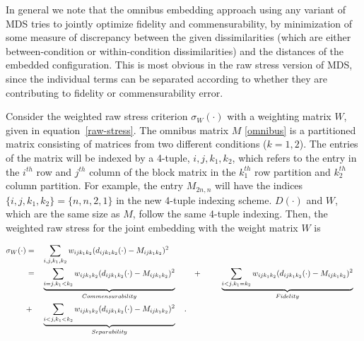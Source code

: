 \documentclass[12pt,oneside,final]{thesis}
\begin{document}
In general we note that the omnibus embedding approach using any variant of MDS tries to jointly optimize fidelity and commensurability, by minimization of some measure of discrepancy between the given dissimilarities (which are either between-condition or within-condition dissimilarities) and the distances of the embedded configuration. This is most obvious in the  raw stress version of  MDS, since the individual terms can be separated according to whether they are contributing to  fidelity or  commensurability  error.

 Consider the weighted raw stress criterion $\sigma_{W}(\cdot)$ with a weighting matrix $W$, given in equation~\eqref{raw-stress}.
 The omnibus matrix $M$ \eqref{omnibus}  is a partitioned matrix consisting of matrices from two different conditions ($k={1,2}$). The entries of the matrix will be indexed by a 4-tuple, ${i,j,k_1,k_2}$, which refers to the entry in the $i^{th}$ row and $j^{th}$ column of the block matrix in  the $k_1^{th}$  row partition and   $k_2^{th}$ column partition. For example, the entry ${M}_{2n,n}$ will have the indices $\{i,j,k_1,k_2\}=\{n,n,2,1\}$ in the new 4-tuple indexing scheme. $D(\cdot)$ and $W$, which are the same size as $M$, follow the same 4-tuple indexing. Then, the weighted raw stress for the joint embedding with the weight matrix $W$ is
 
\begin{align}
\sigma_W(\cdot)  &= & &\sum_{i,j,k_1,k_2} {w_{ij{k_1}{k_2}}(d_{ij{k_1}{k_2}}(\cdot)-M_{ijk_1k_2})^2 } \notag\\
\hspace{3pt} &=& &\underbrace{\sum_{i=j,k_1<k_2}  {w_{ij{k_1}{k_2}}(d_{ij{k_1}{k_2}}(\cdot)-M_{ijk_1k_2})^2}}_{Commensurability}  \hspace{10pt}  &  + &\hspace{2.5em} \underbrace{\sum_{i<j,k_1=k_2}  {w_{ij{k_1}{k_2}}(d_{ij{k_1}{k_2}}(\cdot)-M_{ijk_1k_2})^2  }  } _{Fidelity}\notag\\
\hspace{3pt}&+&  &\underbrace{\sum_{i< j,k_1<k_2}  {w_{ij{k_1}{k_2}}(d_{ij{k_1}{k_2}}(\cdot)-M_{ijk_1k_2})^2  }  } _{Separability}\label{eq:FidCommSep}\hspace{10pt} .
\end{align}
\end{document}
